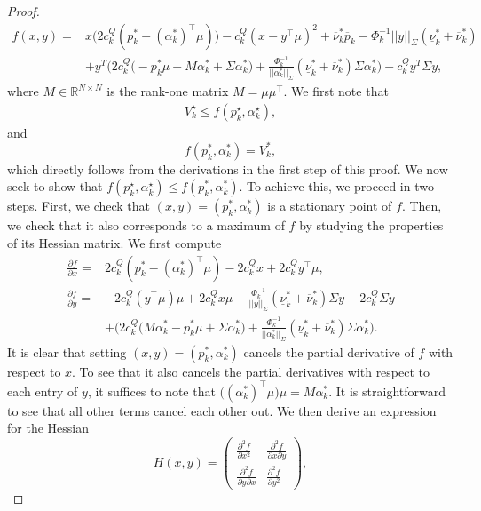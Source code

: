 \documentclass{article}
\begin{document}
\begin{proof}
\begin{align*}
f(x, y) =& x \big(2c_k^Q(p_k^* - (\alpha_k^*)^\top \mu)\big) - c_k^Q(x - y^\top \mu)^2 + \overline{\nu}_k^* \overline{p}_k - \Phi_k^{-1} ||y||_\Sigma (\underline{\nu}_k^* + \overline{\nu}_k^*)\\ 
    &+ y^T \Big(2c_k^Q\big(- p_k^* \mu + M \alpha_k^* + \Sigma \alpha_k^*\big) + \frac{\Phi_k^{-1}}{||\alpha_k^*||_\Sigma}(\underline{\nu}_k^* +\overline{\nu}_k^*) \Sigma \alpha_k^*\Big) - c_k^Q y^T \Sigma y,
\end{align*}
where $M \in \mathbb{R}^{N \times N}$ is the rank-one matrix $M = \mu \mu^\top$.
We first note that
\begin{align*}
V_k^\star \le f(p_k^\star, \alpha_k^\star),
\end{align*} 
and
\begin{equation*}
f(p_k^*, \alpha_k^*) = V_k^*,
\end{equation*}
which directly follows from the derivations in the first step of this proof. We now seek to show that $f(p_k^\star, \alpha_k^\star) \le f(p_k^*, \alpha_k^*)$. To achieve this, we proceed in two steps. First, we check that $(x, y) = (p_k^*, \alpha_k^*)$ is a stationary point of $f$. Then, we check that it also corresponds to a maximum of $f$ by studying the properties of its Hessian matrix. We first compute
\begin{align*}
\frac{\partial f}{\partial x} =& 2c_k^Q(p_k^* - (\alpha_k^*)^\top\mu) - 2 c_k^Q x + 2c_k^Q y^\top \mu,\\
\frac{\partial f}{\partial y} =& - 2c_k^Q (y^\top \mu) \mu + 2 c_k^Q x \mu - \frac{\Phi_k^{-1}}{||y||_\Sigma} (\underline{\nu}_k^* + \overline{\nu}_k^*) \Sigma y - 2c_k^Q \Sigma y\\
&+ \Big(2c_k^Q\big(M \alpha_k^* - p_k^* \mu + \Sigma \alpha_k^*\big) + \frac{\Phi_k^{-1}}{||\alpha_k^*||_\Sigma}(\underline{\nu}_k^* +\overline{\nu}_k^*) \Sigma \alpha_k^*\Big).
\end{align*}
It is clear that setting $(x, y) = (p_k^*, \alpha_k^*)$ cancels the partial derivative of $f$ with respect to $x$. To see that it also cancels the partial derivatives with respect to each entry of $y$, it suffices to note that $\big((\alpha_k^*)^\top \mu\big)\mu = M\alpha_k^*$. It is straightforward to see that all other terms cancel each other out. We then derive an expression for the Hessian
\begin{equation*}
H(x, y) = \begin{pmatrix} \frac{\partial^2 f}{\partial x^2} & \frac{\partial^2 f}{\partial x \partial y} \\ \frac{\partial^2 f}{\partial y \partial x} & \frac{\partial^2 f}{\partial y^2}\end{pmatrix},

\end{equation*}
\end{proof}
\end{document}
